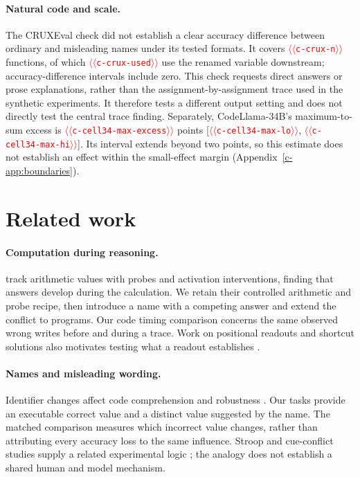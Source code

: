 \documentclass[11pt]{article}
\providecommand{\NUM}[1]{\textcolor{red}{$\langle\langle$\texttt{#1}$\rangle\rangle$}}
\begin{document}
\paragraph{Natural code and scale.} The CRUXEval check
\citep{gu2024cruxeval} did not establish a clear accuracy difference between
ordinary and misleading names under its tested formats. It covers
\NUM{c-crux-n} functions, of which \NUM{c-crux-used} use the renamed variable
downstream; accuracy-difference intervals include zero. This check requests
direct answers or prose explanations, rather than the assignment-by-assignment
trace used in the synthetic experiments. It therefore tests a different output
setting and does not directly test the central trace finding. Separately,
CodeLlama-34B's maximum-to-sum excess is \NUM{c-cell34-max-excess} points
[\NUM{c-cell34-max-lo}, \NUM{c-cell34-max-hi}]. Its interval extends beyond
two points, so this estimate does not establish an effect within the small-effect
margin (Appendix~\ref{c-app:boundaries}).

\section{Related work}

\paragraph{Computation during reasoning.} \citet{kudo2026faithful} track arithmetic
values with probes and activation interventions, finding that answers develop
during the calculation. We retain their controlled arithmetic and probe recipe,
then introduce a name with a competing answer and extend the conflict to programs.
Our code timing comparison concerns the same observed wrong writes before and
during a trace. Work on positional readouts and shortcut solutions also motivates
testing what a readout establishes \citep{liu2026readout,prabhakar2024deciphering}.

\paragraph{Names and misleading wording.} Identifier changes affect code
comprehension and robustness \citep{gao2023cream,le2025names,lam2025codecrash,
le2026obfuscated,orvalho2025mutations}. Our tasks provide an executable correct
value and a distinct value suggested by the name. The matched comparison measures
which incorrect value changes, rather than attributing every accuracy loss to
the same influence. Stroop and cue-conflict studies supply a related experimental
logic \citep{stroop1935,geirhos2019texture,wang2026stroop,hu2026conflict}; the analogy
does not establish a shared human and model mechanism.
\end{document}
